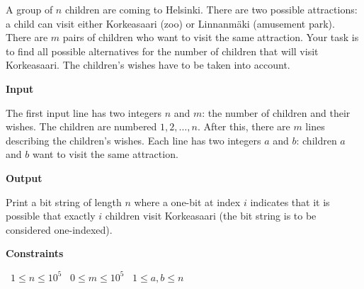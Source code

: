 A group of $n$ children are coming to Helsinki. There are two possible attractions: a child can visit either Korkeasaari (zoo) or Linnanmäki (amusement park).
There are $m$ pairs of children who want to visit the same attraction. Your task is to find all possible alternatives for the number of children that will visit Korkeasaari. The children's wishes have to be taken into account.

\vspace{0.3cm}\noindent\textbf{Input}

The first input line has two integers $n$ and $m$: the number of children and their wishes. The children are numbered $1,2,\dots,n$.
After this, there are $m$ lines describing the children's wishes. Each line has two integers $a$ and $b$: children $a$ and $b$ want to visit the same attraction.

\vspace{0.3cm}\noindent\textbf{Output}

Print a bit string of length $n$ where a one-bit at index $i$ indicates that it is possible that exactly $i$ children visit Korkeasaari (the bit string is to be considered one-indexed).

\vspace{0.3cm}\noindent\textbf{Constraints}

\textbullet\ $1 \le n \le 10^5$
\textbullet\ $0 \le m \le 10^5$
\textbullet\ $1 \le a,b \le n$